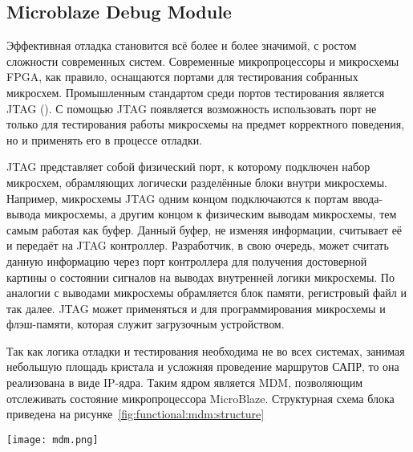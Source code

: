 \subsection{Microblaze Debug Module}
\label{sec:functional:mdm}

Эффективная отладка становится всё более и более значимой, с ростом сложности современных систем. Современные
микропроцессоры и микросхемы FPGA, как правило, оснащаются портами для тестирования собранных микросхем. Промышленным
стандартом среди портов тестирования является JTAG (). С помощью JTAG появляется возможность
использовать порт не только для тестирования работы микросхемы на предмет корректного поведения, но и применять
его в процессе отладки.

JTAG представляет собой физический порт, к которому подключен набор микросхем, обрамляющих
логически разделённые блоки внутри микросхемы. Например, микросхемы JTAG одним концом подключаются к портам
ввода-вывода микросхемы, а другим концом к физическим выводам микросхемы, тем самым работая как буфер. Данный
буфер, не изменяя информации, считывает её и передаёт на JTAG контроллер. Разработчик, в свою очередь, может
считать данную информацию через порт контроллера для получения достоверной картины о состоянии сигналов
на выводах внутренней логики микросхемы. По аналогии с выводами микросхемы обрамляется блок памяти, регистровый
файл и так далее. JTAG может применяться и для программирования микросхемы и флэш-памяти, которая служит
загрузочным устройством.

Так как логика отладки и тестирования необходима не во всех системах, занимая небольшую площадь кристала
и усложняя проведение маршрутов САПР, то она реализована в виде IP-ядра. Таким ядром является MDM,
позволяющим отслеживать состояние  микропроцессора MicroBlaze. Структурная схема блока
приведена на рисунке~\ref{fig:functional:mdm:structure}

\begin{center}
  \centering
  \texttt{[image: mdm.png]}
  \label{fig:functional:mdm:structure}
\end{center}

